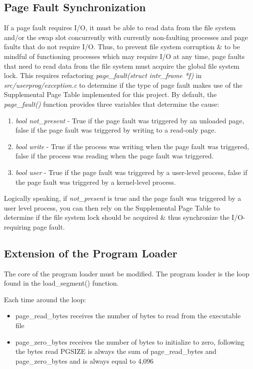 \documentclass[11pt, letterpaper]{article}
\begin{document}
\subsection{Page Fault Synchronization}
	If a page fault requires I/O, it must be able to read data from the file system and/or the swap slot concurrently with currently non-faulting processes and page faults that do not require I/O. Thus, to prevent file system corruption \& to be mindful of functioning processes which may require I/O at any time, page faults that need to read data from the file system must acquire the global file system lock. This requires refactoring \emph{page\_fault(struct intr\_frame *f)} in \emph{src/userprog/exception.c} to determine if the type of page fault makes use of the Supplemental Page Table implemented for this project. By default, the \emph{page\_fault()} function provides three variables that determine the cause:
	\begin{enumerate}
		\item \emph{bool not\_present} - True if the page fault was triggered by an unloaded page, false if the page fault was triggered by writing to a read-only page.
		\item \emph{bool write} - True if the process was writing when the page fault was triggered, false if the process was reading when the page fault was triggered.
		\item \emph{bool user} - True if the page fault was triggered by a user-level process, false if the page fault was triggered by a kernel-level process.
	\end{enumerate}
	Logically speaking, if \emph{not\_present} is true and the page fault was triggered by a user level process, you can then rely on the Supplemental Page Table to determine if the file system lock should be acquired \& thus synchronize the I/O-requiring page fault.
\subsection{Extension of the Program Loader}
The core of the program loader must be modified. The program loader is the loop found in the load\_segment() function. 

Each time around the loop:
\begin{itemize}
\item page\_read\_bytes receives the number of bytes to read from the executable file
\item page\_zero\_bytes receives the number of bytes to initialize to zero, following the bytes read
PGSIZE is always the sum of page\_read\_bytes and page\_zero\_bytes and is always equal to 4,096 
\end{itemize}
\end{document}
